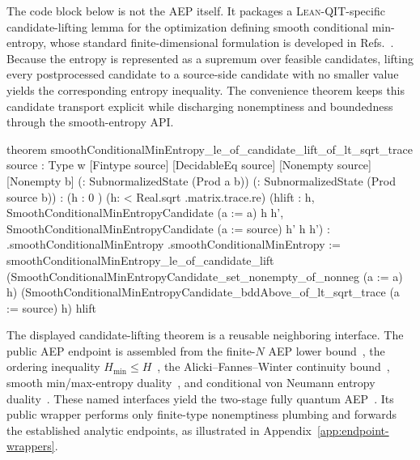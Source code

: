 \documentclass[10pt,a4paper]{article}
\DeclareRobustCommand{\LeanQIT}{\textnormal{\textsc{Lean-QIT}}}
\newif\ifqitLineFocused
\newcommand{\qitHighlightSpan}[2]{%
	\ifnum\value{lstnumber}<#1\relax
	\else
		\ifnum\value{lstnumber}>#2\relax
		\else
			\qitLineFocusedtrue
		\fi
	\fi
}
\begin{document}
The code block below is not the AEP itself.  It packages a \LeanQIT{}-specific candidate-lifting lemma for the optimization defining smooth conditional min-entropy, whose standard finite-dimensional formulation is developed in Refs.~\cite{Renner2005,Tomamichel2015}.  Because the entropy is represented as a supremum over feasible candidates, lifting every postprocessed candidate to a source-side candidate with no smaller value yields the corresponding entropy inequality.  The convenience theorem keeps this candidate transport explicit while discharging nonemptiness and boundedness through the smooth-entropy API.
	
\begin{qitleancode}[title={Smooth-entropy comparison interface},
qit focus={\qitHighlightSpan{12}{13}}]
theorem smoothConditionalMinEntropy_le_of_candidate_lift_of_lt_sqrt_trace
    {source : Type w} [Fintype source] [DecidableEq source]
    [Nonempty source] [Nonempty b]
    (\rhoPost : SubnormalizedState (Prod a b))
    (\rhoSource : SubnormalizedState (Prod source b)) {\epsilon : \mathbbR}
    (h : 0 \le \epsilon)
    (h\epsilonSource : \epsilon < Real.sqrt \rhoSource.matrix.trace.re)
    (hlift : \forall h,
      SmoothConditionalMinEntropyCandidate (a := a) \rhoPost \epsilon h \to
        \exists h',
          SmoothConditionalMinEntropyCandidate (a := source) \rhoSource \epsilon h' \wedge h \le h') :
    \rhoPost.smoothConditionalMinEntropy \epsilon \le
      \rhoSource.smoothConditionalMinEntropy \epsilon :=
  smoothConditionalMinEntropy_le_of_candidate_lift \rhoPost \rhoSource
    (SmoothConditionalMinEntropyCandidate_set_nonempty_of_nonneg (a := a) \rhoPost h)
    (SmoothConditionalMinEntropyCandidate_bddAbove_of_lt_sqrt_trace
      (a := source) \rhoSource h\epsilonSource)
    hlift
\end{qitleancode}
	
The displayed candidate-lifting theorem is a reusable neighboring interface. The public AEP endpoint is assembled from the finite-$N$ AEP lower bound~\cite{TomamichelColbeckRenner2009AEP}, the ordering inequality
$H_{\min}\leq H$~\cite{Tomamichel2015}, the Alicki--Fannes--Winter continuity
bound~\cite{AlickiFannes2004,Winter2016EntropyContinuity}, smooth
min/max-entropy duality~\cite{TomamichelColbeckRenner2010Duality}, and
conditional von Neumann entropy duality~\cite{Wilde2017}. These named interfaces yield the two-stage fully quantum AEP~\cite{TomamichelColbeckRenner2009AEP}.  Its public wrapper performs only finite-type nonemptiness plumbing and forwards the established analytic endpoints, as illustrated in Appendix~\ref{app:endpoint-wrappers}.
\end{document}
